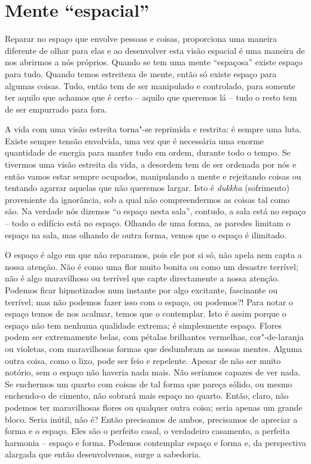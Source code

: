 \section{Mente ``espacial''}

Reparar no espaço que envolve pessoas e coisas, proporciona uma maneira
diferente de olhar para elas e ao desenvolver esta visão espacial é uma
maneira de nos abrirmos a nós próprios. Quando se tem uma mente
``espaçosa'' existe espaço para tudo. Quando temos estreiteza de mente,
então só existe espaço para algumas coisas. Tudo, então tem de ser
manipulado e controlado, para somente ter aquilo que achamos que é certo
-- aquilo que queremos lá -- tudo o resto tem de ser empurrado para
fora.

A vida com uma visão estreita torna"-se reprimida e restrita: é sempre
uma luta. Existe sempre tensão envolvida, uma vez que é necessária uma
enorme quantidade de energia para manter tudo em ordem, durante todo o
tempo. Se tivermos uma visão estreita da vida, a desordem tem de ser
ordenada por nós e então vamos estar sempre ocupados, manipulando a
mente e rejeitando coisas ou tentando agarrar aquelas que não queremos
largar. Isto é \emph{dukkha} (sofrimento) proveniente da ignorância, sob
a qual não compreendermos as coisas tal como são. Na verdade nós dizemos
``o espaço nesta sala'', contudo, a sala está no espaço -- todo o
edifício está no espaço. Olhando de uma forma, as paredes limitam o
espaço na sala, mas olhando de outra forma, vemos que o espaço é
ilimitado.

O espaço é algo em que não reparamos, pois ele por si só, não apela nem
capta a nossa atenção. Não é como uma flor muito bonita ou como um
desastre terrível; não é algo maravilhoso ou terrível que capte
directamente a nossa atenção. Podemos ficar hipnotizados num instante
por algo excitante, fascinante ou terrível; mas não podemos fazer isso
com o espaço, ou podemos?! Para notar o espaço temos de nos acalmar,
temos que o contemplar. Isto é assim porque o espaço não tem nenhuma
qualidade extrema; é simplesmente espaço. Flores podem ser extremamente
belas, com pétalas brilhantes vermelhas, cor"-de-laranja ou violetas, com
maravilhosas formas que deslumbram as nossas mentes. Alguma outra coisa,
como o lixo, pode ser feio e repelente. Apesar de não ser muito notório,
sem o espaço não haveria nada mais. Não seríamos capazes de ver nada. Se
enchermos um quarto com coisas de tal forma que pareça sólido, ou mesmo
enchendo-o de cimento, não sobrará mais espaço no quarto. Então, claro,
não podemos ter maravilhosas flores ou qualquer outra coisa; seria
apenas um grande bloco. Seria inútil, não é? Então precisamos de ambos,
precisamos de apreciar a forma e o espaço. Eles são o perfeito casal, o
verdadeiro casamento, a perfeita harmonia -- espaço e forma. Podemos
contemplar espaço e forma e, da perspectiva alargada que então
desenvolvemos, surge a sabedoria.

